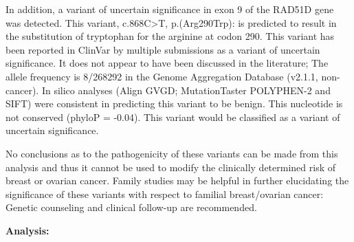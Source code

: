 \documentclass[10pt]{article}
\begin{document}
In addition, a variant of uncertain significance in exon 9 of the RAD51D gene was detected. This variant, c.868C>T, p.(Arg290Trp): is predicted to result in the substitution of tryptophan for the arginine at codon 290. This variant has been reported in ClinVar by multiple submissions as a variant of uncertain significance.  It does not appear to have been discussed in the literature; The allele frequency is 8/268292 in the Genome Aggregation Database (v2.1.1, non-cancer). In silico analyses (Align GVGD; MutationTaster POLYPHEN-2 and SIFT) were consistent in predicting this variant to be benign.  This nucleotide is not conserved (phyloP = -0.04). This variant would be classified as a variant of uncertain significance. 

No conclusions as to the pathogenicity of these variants can be made from this analysis and thus it cannot be used to modify the clinically determined risk of breast or ovarian cancer. Family studies may be helpful in further elucidating the significance of these variants with respect to familial breast/ovarian cancer: Genetic counseling and clinical follow-up are recommended.

{\bf Analysis:}
\end{document}
